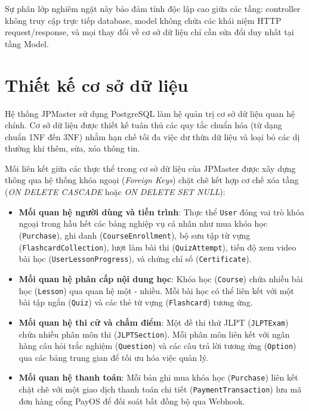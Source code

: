 \documentclass[../DoAn.tex]{subfiles}
\begin{document}
Sự phân lớp nghiêm ngặt này bảo đảm tính độc lập cao giữa các tầng: controller không truy cập trực tiếp database, model không chứa các khái niệm HTTP request/response, và mọi thay đổi về cơ sở dữ liệu chỉ cần sửa đổi duy nhất tại tầng Model.

\section{Thiết kế cơ sở dữ liệu}
\label{section:4.2}

Hệ thống JPMaster sử dụng PostgreSQL làm hệ quản trị cơ sở dữ liệu quan hệ chính. Cơ sở dữ liệu được thiết kế tuân thủ các quy tắc chuẩn hóa (từ dạng chuẩn 1NF đến 3NF) nhằm hạn chế tối đa việc dư thừa dữ liệu và loại bỏ các dị thường khi thêm, sửa, xóa thông tin.

Mối liên kết giữa các thực thể trong cơ sở dữ liệu của JPMaster được xây dựng thông qua hệ thống khóa ngoại (\textit{Foreign Keys}) chặt chẽ kết hợp cơ chế xóa tầng (\textit{ON DELETE CASCADE} hoặc \textit{ON DELETE SET NULL}):
\begin{itemize}
    \item \textbf{Mối quan hệ người dùng và tiến trình}: Thực thể \texttt{User} đóng vai trò khóa ngoại trong hầu hết các bảng nghiệp vụ cá nhân như mua khóa học (\texttt{Purchase}), ghi danh (\texttt{CourseEnrollment}), bộ sưu tập từ vựng (\texttt{FlashcardCollection}), lượt làm bài thi (\texttt{QuizAttempt}), tiến độ xem video bài học (\texttt{UserLessonProgress}), và chứng chỉ số (\texttt{Certificate}).
    \item \textbf{Mối quan hệ phân cấp nội dung học}: Khóa học (\texttt{Course}) chứa nhiều bài học (\texttt{Lesson}) qua quan hệ một - nhiều. Mỗi bài học có thể liên kết với một bài tập ngắn (\texttt{Quiz}) và các thẻ từ vựng (\texttt{Flashcard}) tương ứng.
    \item \textbf{Mối quan hệ thi cử và chấm điểm}: Một đề thi thử JLPT (\texttt{JLPTExam}) chứa nhiều phân môn thi (\texttt{JLPTSection}). Mỗi phân môn liên kết với ngân hàng câu hỏi trắc nghiệm (\texttt{Question}) và các câu trả lời tương ứng (\texttt{Option}) qua các bảng trung gian để tối ưu hóa việc quản lý.
    \item \textbf{Mối quan hệ thanh toán}: Mỗi bản ghi mua khóa học (\texttt{Purchase}) liên kết chặt chẽ với một giao dịch thanh toán chi tiết (\texttt{PaymentTransaction}) lưu mã đơn hàng cổng PayOS để đối soát bất đồng bộ qua Webhook.
\end{itemize}
\end{document}
